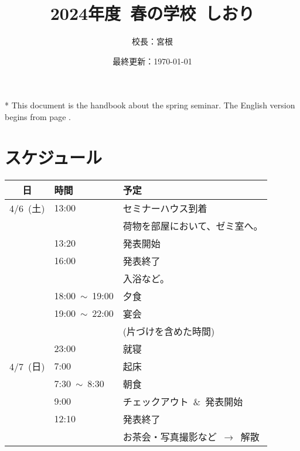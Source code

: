 \documentclass[unicode,a4paper,11pt]{ltjsarticle}
\title{
    2024年度\ 春の学校\ しおり
}
\author{
  校長：宮根
}
\date{最終更新：\today}
\begin{document}
\maketitle
\tableofcontents

\hspace*{5pt}

* This document is the handbook about the spring seminar. The English version begins from page \pageref{eng_page}.

\clearpage

\section{スケジュール}

\begin{center}
  \begin{tabular}{cll}\hline
    日        & 時間                 & 予定                                      \\ \hline
    4/6\ (土) & 13:00                & セミナーハウス到着                        \\
              &                      & 荷物を部屋において、ゼミ室へ。            \\
              & 13:20                & 発表開始                                  \\
              & 16:00                & 発表終了                                  \\
              &                      & 入浴など。                                \\
              & 18:00\ $\sim$\ 19:00 & 夕食                                      \\
              & 19:00\ $\sim$\ 22:00 & 宴会                                      \\
              &                      & (片づけを含めた時間)                      \\
              & 23:00                & 就寝                                      \\ \hline
    4/7\ (日) & 7:00                 & 起床                                      \\
              & 7:30\ $\sim$\  8:30  & 朝食                                      \\
              & 9:00                 & チェックアウト\ \&\ 発表開始              \\
              & 12:10                & 発表終了                                  \\
              &                      & お茶会・写真撮影など\ $\rightarrow$\ 解散
  \end{tabular}
\end{center}
\end{document}
